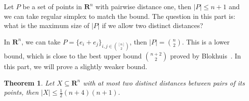 \documentclass{article}
\newtheorem{theorem}{Theorem}[section]
\theoremstyle{definition}
\begin{document}
Let $P$ be a set of points in $\mathbf{R}^{n}$ with pairwise distance one, then $|P|\leq n+1$ and we can take regular simplex to match the bound. The question in this part is: what is the maximum size of $|P|$ if we allow two distinct distances?

In $\mathbf{R}^{n}$, we can take $P=\{ e_{i}+e_{j} \}_{i,j\in \binom{[n]}{2}}$, then $|P|=\binom{n}{2}$. This is a lower bound, which is close to the best upper bound $\binom{n+2}{2}$ proved by Blokhuis~\cite{blokhuis1981new}. In this part, we will prove a slightly weaker bound.

\begin{theorem}
    Let $X\subseteq \mathbf{R}^{n}$ with at most two distinct distances between pairs of its points, then $|X|\leq \frac{1}{2}(n+4)(n+1)$.
\end{theorem}
\end{document}
